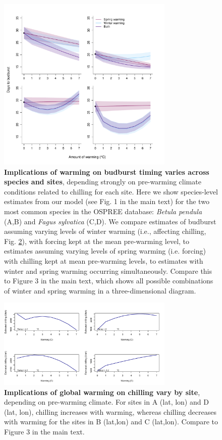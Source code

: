 \documentclass{article}
\begin{document}
\begin{figure}[h!]
\centering
\noindent \includegraphics[width=0.75\textwidth]{..//..//analyses/bb_analysis/figures/forecasting/tempforecastbothspp_1_7_degwarm.pdf}
\caption{\textbf{Implications of warming on budburst timing varies across species and sites}, depending strongly on pre-warming climate conditions related to chilling for each site. Here we show species-level estimates from our model (see Fig. 1 in the main text) for the two most common species in the OSPREE database: \emph{Betula pendula} (A,B) and \emph{Fagus sylvatica} (C,D). We compare estimates of budburst assuming varying levels of winter warming (i.e., affecting chilling, Fig. \ref{fig:chillfore}), with forcing kept at the mean pre-warming level, to estimates assuming varying levels of spring warming (i.e. forcing) with chilling kept at mean pre-warming levels, to estimates with winter and spring warming occurring simultaneously. Compare  this to Figure 3 in the main text, which shows all possible combinations of winter and spring warming in a three-dimensional diagram. }
\label{fig:betpenfagsyl}
\end{figure}


\begin{figure}[h!]
\centering
\noindent \includegraphics[width=0.75\textwidth]{..//..//analyses/bb_analysis/figures/forecasting/chillforecast_bothspp_PEP_utah.pdf}
\caption{\textbf{Implications of global warming on chilling vary by site}, depending on pre-warming climate. For sites in A (lat, lon) and D (lat, lon), chilling increases with warming, whereas chilling decreases with warming for the sites in B (lat,lon) and C (lat,lon). Compare to Figure 3 in the main text.}
\label{fig:chillfore}
\end{figure}
\end{document}
